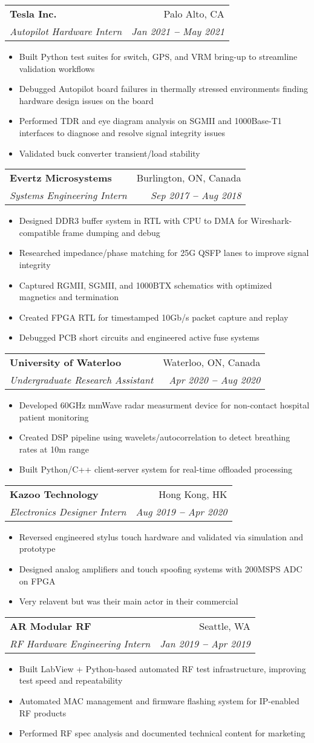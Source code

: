 \documentclass[letterpaper,11pt]{article}
\makeatletter
\newcommand{\resumeItem}[1]{
  \item\small{
    {#1 \vspace{-2pt}}
  }
}
\newcommand{\resumeSubheading}[4]{
  \vspace{-2pt}\item
    \begin{tabular*}{0.97\textwidth}[t]{l@{\extracolsep{\fill}}r}
      \textbf{#1} & #2 \\
      \textit{\small#3} & \textit{\small #4} \\
    \end{tabular*}\vspace{-7pt}
}
\newcommand{\resumeItemListStart}{\begin{itemize}}
\newcommand{\resumeItemListEnd}{\end{itemize}\vspace{-5pt}}
\makeatother
\begin{document}
  \resumeSubheading
    {Tesla Inc.}{Palo Alto, CA}
    {Autopilot Hardware Intern}{Jan 2021 \textbf{--} May 2021}
    \resumeItemListStart
      \resumeItem{Built Python test suites for switch, GPS, and VRM bring-up to streamline validation workflows}
      \resumeItem{Debugged Autopilot board failures in thermally stressed environments finding hardware design issues on the board}
      \resumeItem{Performed TDR and eye diagram analysis on SGMII and 1000Base-T1 interfaces to diagnose and resolve signal integrity issues}
      \resumeItem{Validated buck converter transient/load stability}
    \resumeItemListEnd

  \resumeSubheading
    {Evertz Microsystems}{Burlington, ON, Canada}
    {Systems Engineering Intern}{Sep 2017 \textbf{--} Aug 2018}
    \resumeItemListStart
      \resumeItem{Designed DDR3 buffer system in RTL with CPU to DMA for Wireshark-compatible frame dumping and debug}
      \resumeItem{Researched impedance/phase matching for 25G QSFP lanes to improve signal integrity}
      \resumeItem{Captured RGMII, SGMII, and 1000BTX schematics with optimized magnetics and termination}
      \resumeItem{Created FPGA RTL for timestamped 10Gb/s packet capture and replay}
      \resumeItem{Debugged PCB short circuits and engineered active fuse systems}
    \resumeItemListEnd

  \resumeSubheading
    {University of Waterloo}{Waterloo, ON, Canada}
    {Undergraduate Research Assistant}{Apr 2020 \textbf{--} Aug 2020}
    \resumeItemListStart
      \resumeItem{Developed 60GHz mmWave radar measurment device for non-contact hospital patient monitoring}
      \resumeItem{Created DSP pipeline using wavelets/autocorrelation to detect breathing rates at 10m range}
      \resumeItem{Built Python/C++ client-server system for real-time offloaded processing}
    \resumeItemListEnd


  \resumeSubheading
    {Kazoo Technology}{Hong Kong, HK}
    {Electronics Designer Intern}{Aug 2019 \textbf{--} Apr 2020}
    \resumeItemListStart
      \resumeItem{Reversed engineered stylus touch hardware and validated via simulation and prototype}
      \resumeItem{Designed analog amplifiers and touch spoofing systems with 200MSPS ADC on FPGA}
      \resumeItem{Very relavent but was their main actor in their commercial}
    \resumeItemListEnd

  \resumeSubheading
    {AR Modular RF}{Seattle, WA}
    {RF Hardware Engineering Intern}{Jan 2019 \textbf{--} Apr 2019}
    \resumeItemListStart
      \resumeItem{Built LabView + Python-based automated RF test infrastructure, improving test speed and repeatability}
      \resumeItem{Automated MAC management and firmware flashing system for IP-enabled RF products}
      \resumeItem{Performed RF spec analysis and documented technical content for marketing}
    \resumeItemListEnd
\end{document}
